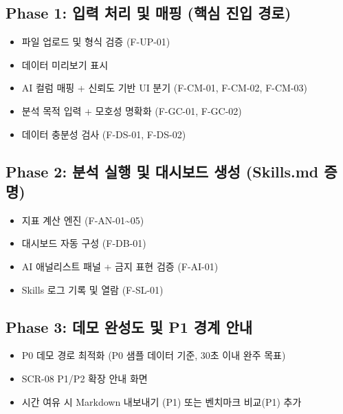 \documentclass[10pt,a4paper]{article}
\providecommand{\tightlist}{\setlength{\itemsep}{0pt}\setlength{\parskip}{0pt}}
\begin{document}
\subsection{Phase 1: 입력 처리 및 매핑 (핵심 진입 경로)}\label{phase-1-uxc785uxb825-uxcc98uxb9ac-uxbc0f-uxb9e4uxd551-uxd575uxc2ec-uxc9c4uxc785-uxacbduxb85c}

\begin{itemize}
\tightlist
\item
  파일 업로드 및 형식 검증 (F-UP-01)
\item
  데이터 미리보기 표시
\item
  AI 컬럼 매핑 + 신뢰도 기반 UI 분기 (F-CM-01, F-CM-02, F-CM-03)
\item
  분석 목적 입력 + 모호성 명확화 (F-GC-01, F-GC-02)
\item
  데이터 충분성 검사 (F-DS-01, F-DS-02)
\end{itemize}

\subsection{Phase 2: 분석 실행 및 대시보드 생성 (Skills.md 증명)}\label{phase-2-uxbd84uxc11d-uxc2e4uxd589-uxbc0f-uxb300uxc2dcuxbcf4uxb4dc-uxc0dduxc131-skills.md-uxc99duxba85}

\begin{itemize}
\tightlist
\item
  지표 계산 엔진 (F-AN-01\textasciitilde05)
\item
  대시보드 자동 구성 (F-DB-01)
\item
  AI 애널리스트 패널 + 금지 표현 검증 (F-AI-01)
\item
  Skills 로그 기록 및 열람 (F-SL-01)
\end{itemize}

\subsection{Phase 3: 데모 완성도 및 P1 경계 안내}\label{phase-3-uxb370uxbaa8-uxc644uxc131uxb3c4-uxbc0f-p1-uxacbduxacc4-uxc548uxb0b4}

\begin{itemize}
\tightlist
\item
  P0 데모 경로 최적화 (P0 샘플 데이터 기준, 30초 이내 완주 목표)
\item
  SCR-08 P1/P2 확장 안내 화면
\item
  시간 여유 시 Markdown 내보내기 (P1) 또는 벤치마크 비교(P1) 추가
\end{itemize}
\end{document}
